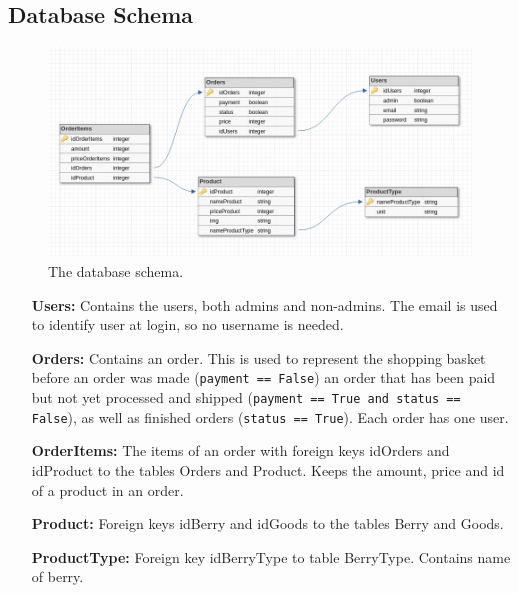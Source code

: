\newpage

\subsection{Database Schema}

\begin{figure}[H]
  \centering
  \includegraphics[width=\textwidth]{second_sprint/db_schema.png}
  \caption{\label{fig:schema} The database schema.}
\end{figure}

\begin{itemize}
  \item[\textbf{Users:}] Contains the users, both admins and non-admins. The
    email is used to identify user at login, so no username is needed.
  \item[\textbf{Orders:}] Contains an order. This is used to represent
    the shopping basket before an order was made 
    (\texttt{payment == False}) an order that has been paid but not 
    yet processed and shipped 
    (\texttt{payment == True and status == False}), as well as
    finished orders (\texttt{status == True}). Each order has
    one user.
  \item[\textbf{OrderItems:}] The items of an order with foreign keys
    idOrders and idProduct to the tables Orders and Product.  Keeps the
    amount, price and id of a product in an order.
  \item[\textbf{Product:}] Foreign keys idBerry and idGoods to the tables
    Berry and Goods.
  \item[\textbf{ProductType:}] Foreign key idBerryType to table BerryType. Contains
    name of berry.
\end{itemize}
